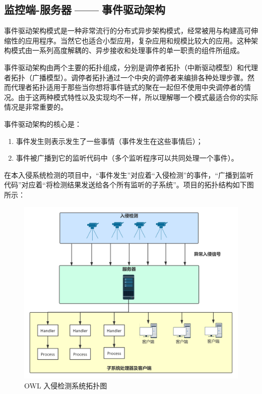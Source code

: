 \documentclass[article]{BJTU-thesis}
\begin{document}
\subsection{监控端-服务器$\;$——$\;$事件驱动架构}

事件驱动架构模式是一种非常流行的分布式异步架构模式，经常被用与构建高可伸缩性的应用程序。当然它也适合小型应用，复杂应用和规模比较大的应用。这种架构模式由一系列高度解耦的、异步接收和处理事件的单一职责的组件所组成。

事件驱动架构由两个主要的拓扑组成，分别是调停者拓扑（中断驱动模型）和代理者拓扑（广播模型）。调停者拓扑通过一个中央的调停者来编排各种处理步骤。然而代理者拓扑适用于那些当你想将事件链式的聚在一起但不使用中央调停者的情况。由于这两种模式特性以及实现均不一样，所以理解哪一个模式最适合你的实际情况是非常重要的。

事件驱动架构的核心是：
\begin{enumerate}
\item 事件发生则表示发生了一些事情（事件发生在这些事情后）；
\item 事件被广播到它的监听代码中（多个监听程序可以共同处理一个事件）。
\end{enumerate}
在本入侵系统检测的项目中，“事件发生”对应着“入侵检测”的事件，“广播到监听代码”对应着“将检测结果发送给各个所有监听的子系统”。项目的拓扑结构如下图所示：

\begin{figure}[!htbp]
	\centering
	\includegraphics[scale=.25]{img/t2.png}
		\caption{OWL 入侵检测系统拓扑图}
\end{figure}
\end{document}
